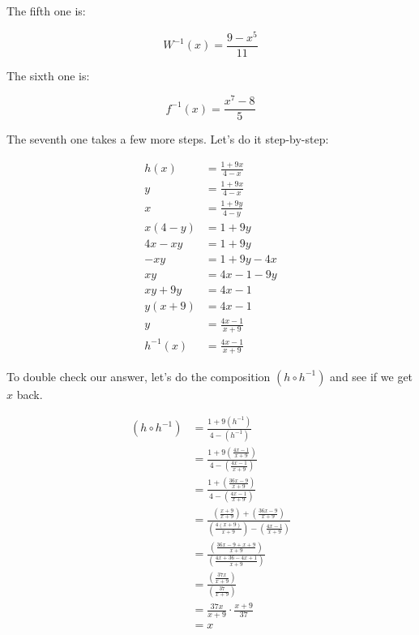 \documentclass[12pt]{article}
\begin{document}
The fifth one is:

\begin{equation}
    W^{-1}(x) = \frac{9-x^5}{11}
\end{equation}

The sixth one is:

\begin{equation}
    f^{-1}(x) = \frac{x^7-8}{5}
\end{equation}

The seventh one takes a few more steps.
Let's do it step-by-step:

\begin{align}
    h(x)      & = \frac{1+9x}{4-x} \\
    y         & = \frac{1+9x}{4-x} \\
    x         & = \frac{1+9y}{4-y} \\
    x(4-y)    & = 1+9y             \\
    4x - xy   & = 1+9y             \\
    -xy       & = 1+9y-4x          \\
    xy        & = 4x-1-9y          \\
    xy+9y     & = 4x-1             \\
    y(x+9)    & = 4x-1             \\
    y         & = \frac{4x-1}{x+9} \\
    h^{-1}(x) & = \frac{4x-1}{x+9}
\end{align}

To double check our answer, let's do the composition $(h \circ h^{-1})$ and see if we get $x$ back.

\begin{align}
    (h \circ h^{-1}) & = \frac{1+9(h^{-1})}{4-(h^{-1})}                                                                                                    \\
                     & = \frac{1+9\left(\frac{4x-1}{x+9}\right)}{4-\left(\frac{4x-1}{x+9}\right)}                                                          \\
                     & = \frac{1+\left(\frac{36x-9}{x+9}\right)}{4-\left(\frac{4x-1}{x+9}\right)}                                                          \\
                     & = \frac{\left(\frac{x+9}{x+9}\right)+\left(\frac{36x-9}{x+9}\right)}{\left(\frac{4(x+9)}{x+9}\right)-\left(\frac{4x-1}{x+9}\right)} \\
                     & = \frac{\left(\frac{36x-9+x+9}{x+9}\right)}{\left(\frac{4x+36-4x+1}{x+9}\right)}                                                    \\
                     & = \frac{\left(\frac{37x}{x+9}\right)}{\left(\frac{37}{x+9}\right)}                                                                  \\
                     & = \frac{37x}{x+9} \cdot \frac{x+9}{37}                                                                                              \\
                     & = x
\end{align}
\end{document}

